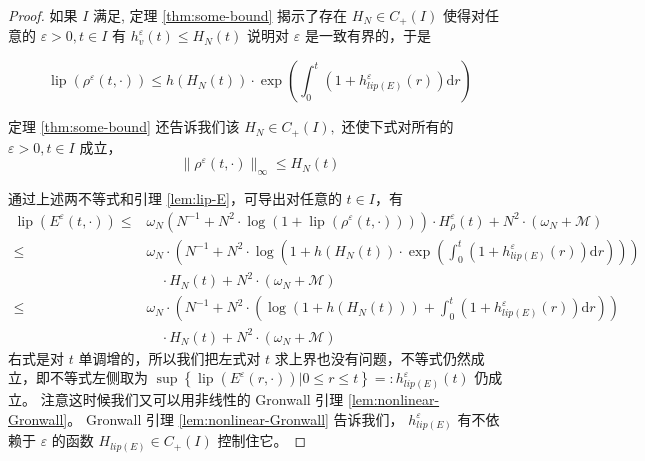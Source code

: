 \begin{proof}
如果 $I$ 满足\boundcondition , 定理 \ref{thm:some-bound} 揭示了存在 $H_N \in C_{+}(I)$ 使得对任意的 $\varepsilon>0, t \in I$ 有 $h_{v}^{\varepsilon}(t) \leqslant H_{N}(t) $ 说明对 $\varepsilon$ 是一致有界的，于是

\begin{equation}
    \label{eq:lip-rho-control}
    \operatorname{lip}\left(\rho^{\varepsilon}(t, \cdot)\right) \leqslant h\left(H_{N}(t)\right) \cdot \exp \left(\int_{0}^{t}\left(1+h^{\varepsilon}_{lip(E)}(r)\right) \mathrm{d} r\right)
\end{equation}

定理 \ref{thm:some-bound} 还告诉我们该 $H_{N} \in C_{+}(I),$ 还使下式对所有的  $\varepsilon>0, t \in I$ 成立，
\begin{equation}
    \|\rho^{\varepsilon}(t, \cdot)\|_{\infty} \leqslant H_{N}(t)
\end{equation}

通过上述两不等式和引理 \ref{lem:lip-E}，可导出对任意的 $t \in I$，有
\[
\begin{aligned}
\operatorname{lip}\left(E^{\varepsilon}(t, \cdot)\right) \leqslant & \omega_{N}\left(N^{-1}+N^{2} \cdot \log \left(1+\operatorname{lip}\left(\rho^{\varepsilon}(t, \cdot)\right)\right)\right) \cdot H_{\rho}^{\varepsilon}(t) +N^{2} \cdot\left(\omega_{N}+\mathcal{M}\right) \\
\leqslant & \omega_{N} \cdot\left(N^{-1}+N^{2} \cdot \log \left(1+h\left(H_{N}(t)\right)\cdot \exp \left(\int_{0}^{t}\left(1+h^{\varepsilon}_{lip(E)}(r)\right) \mathrm{d} r\right)\right)\right)\\
& \quad \cdot H_{N}(t)+N^{2} \cdot\left(\omega_{N}+\mathcal{M}\right) \\
\leqslant & \omega_{N} \cdot\left(N^{-1}+N^{2} \cdot\left(\log \left(1+h\left(H_{N}(t)\right)\right) +\int_{0}^{t}\left(1+h^{\varepsilon}_{lip(E)}(r)\right) \mathrm{d} r\right)\right)\\
&\quad \cdot H_{N}(t)+N^{2} \cdot\left(\omega_{N}+\mathcal{M}\right)
\end{aligned}
\]
右式是对 $t$ 单调增的，所以我们把左式对 $t$ 求上界也没有问题，不等式仍然成立，即不等式左侧取为 $\sup \left\{\operatorname{lip}\left(E^{\varepsilon}(r, \cdot)\right) | 0 \leqslant r \leqslant t\right\}=:h^{\varepsilon}_{lip(E)}(t)$ 仍成立。 注意这时候我们又可以用非线性的 Gronwall 引理 \ref{lem:nonlinear-Gronwall}。 Gronwall 引理 \ref{lem:nonlinear-Gronwall} 告诉我们， $h^{\varepsilon}_{lip(E)}$ 有不依赖于 $\varepsilon$ 的函数 $H_{lip(E)}\in C_+(I)$ 控制住它。 


\end{proof}
